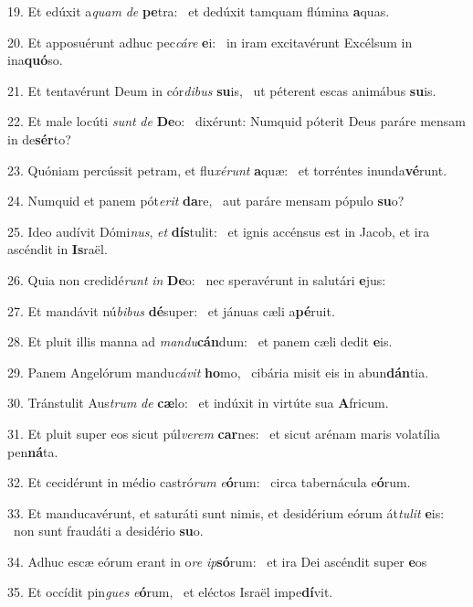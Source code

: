 19. Et edúxit a\textit{quam} \textit{de} \textbf{pe}tra: \ast\  et dedúxit tamquam flúmina \textbf{a}quas.\

20. Et apposuérunt adhuc pec\textit{cá}\textit{re} \textbf{e}i: \ast\  in iram excitavérunt Excélsum in ina\textbf{quó}so.\

21. Et tentavérunt Deum in cór\textit{di}\textit{bus} \textbf{su}is, \ast\  ut péterent escas animábus \textbf{su}is.\

22. Et male locúti \textit{sunt} \textit{de} \textbf{De}o: \ast\  dixérunt: Numquid póterit Deus paráre mensam in de\textbf{sér}to?\

23. Quóniam percússit petram, et flu\textit{xé}\textit{runt} \textbf{a}quæ: \ast\  et torréntes inunda\textbf{vé}runt.\

24. Numquid et panem pót\textit{e}\textit{rit} \textbf{da}re, \ast\  aut paráre mensam pópulo \textbf{su}o?\

25. Ideo audívit Dómi\textit{nus}, \textit{et} \textbf{dís}tulit: \ast\  et ignis accénsus est in Jacob, et ira ascéndit in \textbf{Is}raël.\

26. Quia non credidé\textit{runt} \textit{in} \textbf{De}o: \ast\  nec speravérunt in salutári \textbf{e}jus:\

27. Et mandávit nú\textit{bi}\textit{bus} \textbf{dé}super: \ast\  et jánuas cæli a\textbf{pé}ruit.\

28. Et pluit illis manna ad \textit{man}\textit{du}\textbf{cán}dum: \ast\  et panem cæli dedit \textbf{e}is.\

29. Panem Angelórum mandu\textit{cá}\textit{vit} \textbf{ho}mo, \ast\  cibária misit eis in abun\textbf{dán}tia.\

30. Tránstulit Aus\textit{trum} \textit{de} \textbf{cæ}lo: \ast\  et indúxit in virtúte sua \textbf{A}fricum.\

31. Et pluit super eos sicut púl\textit{ve}\textit{rem} \textbf{car}nes: \ast\  et sicut arénam maris volatília pen\textbf{ná}ta.\

32. Et cecidérunt in médio castró\textit{rum} \textit{e}\textbf{ó}rum: \ast\  circa tabernácula e\textbf{ó}rum.\

33. Et manducavérunt, et saturáti sunt nimis, et desidérium eórum át\textit{tu}\textit{lit} \textbf{e}is: \ast\  non sunt fraudáti a desidério \textbf{su}o.\

34. Adhuc escæ eórum erant in o\textit{re} \textit{ip}\textbf{só}rum: \ast\  et ira Dei ascéndit super \textbf{e}os\

35. Et occídit pin\textit{gues} \textit{e}\textbf{ó}rum, \ast\  et eléctos Israël impe\textbf{dí}vit.\

